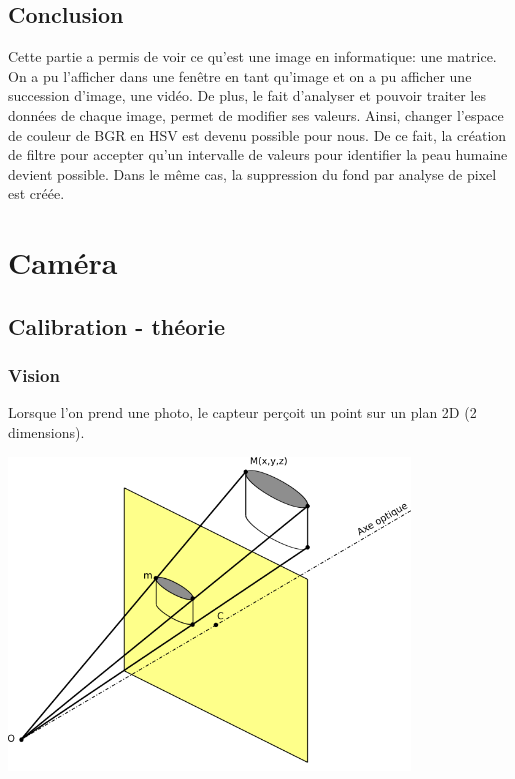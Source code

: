 \documentclass[12pt, french]{report}
\begin{document}
    \subsection{Conclusion}
    
    Cette partie a permis de voir ce qu'est une image en informatique: une matrice. On a pu l'afficher dans une fenêtre en tant qu'image et on a pu afficher une succession d'image, une vidéo. De plus, le fait d'analyser et pouvoir traiter les données de chaque image, permet de  modifier ses valeurs. Ainsi, changer l'espace de couleur de BGR en HSV est devenu possible pour nous. De ce fait, la création de filtre pour accepter qu'un intervalle de valeurs pour identifier la peau humaine devient possible. Dans le même cas, la suppression du fond par analyse de pixel est créée. 
    \newpage
\section{Caméra}
\subsection{Calibration - théorie}
\subsubsection{Vision}
Lorsque l'on prend une photo, le capteur perçoit un point sur un plan 2D (2 dimensions).\\

\begin{center}
    \includegraphics[width=0.8\textwidth]{Images/Vision/Projection2D.png}
\end{center}
\end{document}
